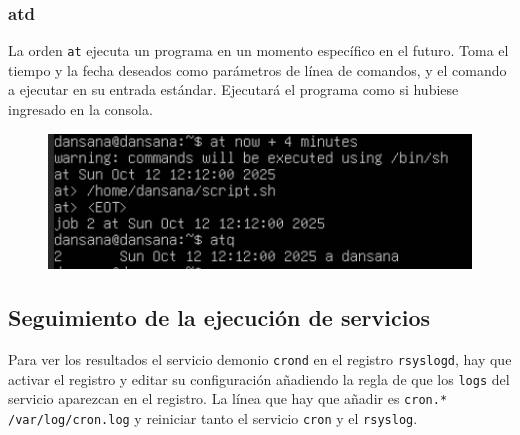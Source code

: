 \documentclass[10pt]{article}
\begin{document}
	\subsubsection{atd}
	La orden \verb|at| ejecuta un programa en un momento específico en el futuro. Toma el tiempo y la fecha deseados como parámetros de línea de comandos, y el comando a ejecutar en su entrada estándar. Ejecutará el programa como si hubiese ingresado en la consola.
	\begin{figure}[H]
		\setlength{\abovecaptionskip}{0cm}
		\setlength{\belowcaptionskip}{0cm}
		\centering
		\includegraphics[width=0.7\linewidth]{Recursos/at.png}
	\end{figure}
	
	\subsection{Seguimiento de la ejecución de servicios}
	Para ver los resultados el servicio demonio \verb|crond| en el registro \verb|rsyslogd|, hay que activar el registro y editar su configuración añadiendo la regla de que los \verb|logs| del servicio aparezcan en el registro. La línea que hay que añadir es \verb|cron.*	/var/log/cron.log| y reiniciar tanto el servicio \verb|cron| y el \verb|rsyslog|.
	
	\clearpage
	
	
	
\end{document}
